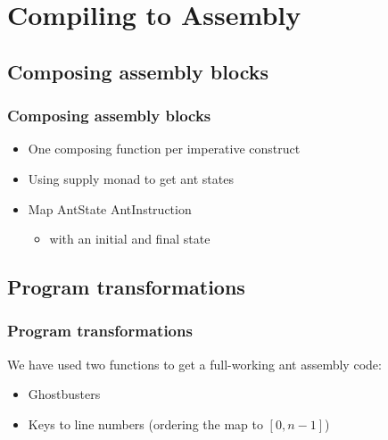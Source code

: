 \documentclass{beamer}
\begin{document}
    \section{Compiling to Assembly}
        \subsection{Composing assembly blocks}
        \begin{frame}
            \frametitle{Composing assembly blocks}
            \begin{itemize}
                \item One composing function per imperative construct
                \item Using supply monad to get ant states
                \item Map AntState AntInstruction
                \begin{itemize}
                    \item with an initial and final state
                \end{itemize}
            \end{itemize}
        \end{frame}

        \subsection{Program transformations}
        \begin{frame}
            \frametitle{Program transformations}
            We have used two functions to get a full-working ant assembly code:
            \begin{itemize}
                \item Ghostbusters
                \item Keys to line numbers (ordering the map to $ [0, n-1] $)
            \end{itemize}
        \end{frame}
\end{document}
